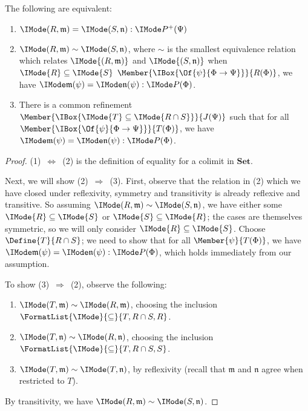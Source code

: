 \documentclass{article}
\newcommand\AreSubsetEq[1]{\FormatList{\IMode}{\subseteq}{#1}}
\newcommand\Sets{\mathbf{Set}}
\newcommand\IsSubsetEq[2]{\IMode{#1}\subseteq\IMode{#2}}
\begin{document}
\begin{lem}\label{lem:plus-construction-equality}
  The following are equivalent:
  \begin{enumerate}
  \item $\IsEqOf{(R,\mathfrak{m})}{(S,\mathfrak{n})}{\Plus{P}(\Psi)}$
  \item $\Sim{(R,\mathfrak{m})}{(S,\mathfrak{n})}$, where
    $\sim$ is the smallest equivalence relation which relates
    $\IMode{(R,\mathfrak{m})}$ and $\IMode{(S,\mathfrak{n})}$ when $\IsSubsetEq{R}{S}$
    $\Member{\IBox{\Of{\psi}{\Phi\to\Psi}}}{R(\Phi)}$, we have
    $\IsEqOf{\mathfrak{m}(\psi)}{\mathfrak{n}(\psi)}{P(\Phi)}$.
  \item There is a common refinement
    $\Member{\IBox{\IsSubsetEq{T}{R\cap S}}}{J(\Psi)}$ such that for
    all $\Member{\IBox{\Of{\psi}{\Phi\to\Psi}}}{T(\Phi)}$, we have
    $\IsEqOf{\mathfrak{m}(\psi)}{\mathfrak{n}(\psi)}{P(\Phi)}$.
  \end{enumerate}
\end{lem}
\begin{proof}
  (1)~$\Leftrightarrow$~(2) is the definition of equality for a colimit in
  $\Sets$.
   
  Next, we will show (2)~$\Rightarrow$~(3).
%
  First, observe that the relation in (2) which we have closed under
  reflexivity, symmetry and transitivity is already reflexive and
  transitive. So assuming $\Sim{(R,\mathfrak{m})}{(S,\mathfrak{n})}$,
  we have either some $\IsSubsetEq{R}{S}$ or
  $\IsSubsetEq{S}{R}$; the cases are themselves symmetric, so
  we will only consider $\IsSubsetEq{R}{S}$. Choose
  $\Define{T}{R\cap S}$; we need to show that
  for all $\Member{\psi}{T(\Phi)}$, we have
  $\IsEqOf{\mathfrak{m}(\psi)}{\mathfrak{n}(\psi)}{P(\Phi)}$, which
  holds immediately from our assumption.

  To show (3)~$\Rightarrow$~(2), observe the following:
  \begin{enumerate}
  \item $\Sim{(T,\mathfrak{m})}{(R,\mathfrak{m})}$, choosing the
    inclusion $\AreSubsetEq{T,R\cap S,R}$.
  \item $\Sim{(T,\mathfrak{n})}{(R,\mathfrak{n})}$, choosing the
    inclusion $\AreSubsetEq{T,R\cap S,S}$.
  \item $\Sim{(T,\mathfrak{m})}{(T,\mathfrak{n})}$, by reflexivity
    (recall that $\mathfrak{m}$ and $\mathfrak{n}$ agree when
    restricted to $T$).
  \end{enumerate}
  By transitivity, we have $\Sim{(R,\mathfrak{m})}{(S,\mathfrak{n})}$.
\end{proof}
\end{document}
